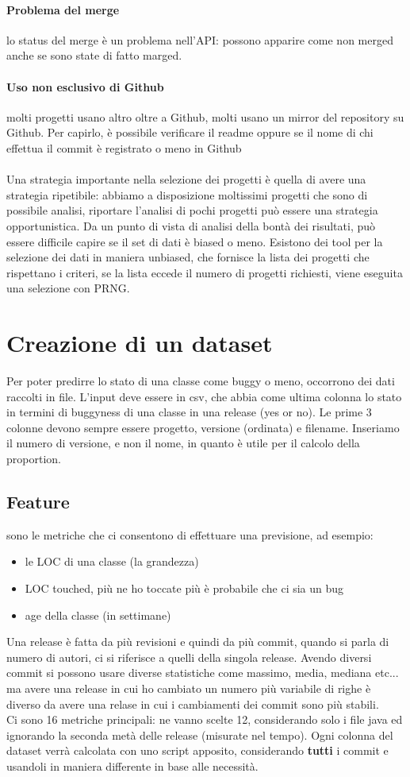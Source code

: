 \documentclass{article}
\begin{document}
\paragraph{Problema del merge}lo status del merge è un problema nell'API: possono apparire come non merged anche se sono state di fatto marged.
\paragraph{Uso non esclusivo di Github}molti progetti usano altro oltre a Github, molti usano un mirror del repository su Github. Per capirlo, è possibile verificare il readme oppure se il nome di chi effettua il commit è registrato o meno in Github\\\\ Una strategia importante nella selezione dei progetti è quella di avere una strategia ripetibile: abbiamo a disposizione moltissimi progetti che sono di possibile analisi, riportare l'analisi di pochi progetti può essere una strategia opportunistica. Da un punto di vista di analisi della bontà dei risultati, può essere difficile capire se il set di dati è biased o meno. Esistono dei tool per la selezione dei dati in maniera unbiased, che fornisce la lista dei progetti che rispettano i criteri, se la lista eccede il numero di progetti richiesti, viene eseguita una selezione con PRNG.
\section{Creazione di un dataset}
Per poter predirre lo stato di una classe come buggy o meno, occorrono dei dati raccolti in file. L'input deve essere in csv, che abbia come ultima colonna lo stato in termini di buggyness di una classe in una release (yes or no). Le prime 3 colonne devono sempre essere progetto, versione (ordinata) e filename. Inseriamo il numero di versione, e non il nome, in quanto è utile per il calcolo della proportion.
\subsection{Feature}sono le metriche che ci consentono di effettuare una previsione, ad esempio:
\begin{itemize}
\item le LOC di una classe (la grandezza)
\item LOC touched, più ne ho toccate più è probabile che ci sia un bug
\item age della classe (in settimane)
\end{itemize}
Una release è fatta da più revisioni e quindi da più commit, quando si parla di numero di autori, ci si riferisce a quelli della singola release. Avendo diversi commit si possono usare diverse statistiche come massimo, media, mediana etc... ma avere una release in cui ho cambiato un numero più variabile di righe è diverso da avere una relase in cui i cambiamenti dei commit sono più stabili.\\ Ci sono 16 metriche principali: ne vanno scelte 12, considerando solo i file java ed ignorando la seconda metà delle release (misurate nel tempo). Ogni colonna del dataset verrà calcolata con uno script apposito, considerando \textbf{tutti} i commit e usandoli in maniera differente in base alle necessità.
\end{document}
